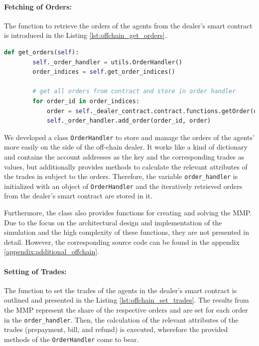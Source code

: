 \paragraph{Fetching of Orders:} The function to retrieve the orders of the agents from the dealer's 
smart contract is introduced in the Listing \ref{lst:offchain_get_orders}.

\begin{lstlisting}[float=htbp, label=lst:offchain_get_orders, caption=Fetching of Orders from Smart Contract Dealer, language=Python]
    def get_orders(self):
        self._order_handler = utils.OrderHandler()
        order_indices = self.get_order_indices()

        # get all orders from contract and store in order handler
        for order_id in order_indices:
            order = self._dealer_contract.contract.functions.getOrder(order_id).call()
            self._order_handler.add_order(order_id, order)
\end{lstlisting}

We developed a class \verb|OrderHandler| to store and manage the orders of the agents' more easily
on the side of the off-chain dealer. 
It works like a kind of dictionary and contains the account addresses as the key 
and the corresponding trades as values, but additionally provides methods to calculate
the relevant attributes of the trades in subject to the orders.
Therefore, the variable \verb|order_handler| is initialized with an object of \verb|OrderHandler|
and the iteratively retrieved orders from the dealer's smart contract are stored in it.

Furthermore, the class also provides functions for creating and solving the MMP.
Due to the focus on the architectural design and implementation of the simulation and the high complexity
of these functions, they are not presented in detail. However, the corresponding source code can be found in the appendix \ref{appendix:additional_offchain}.

\paragraph{Setting of Trades:} The function to set the trades of the agents in the dealer's smart contract 
is outlined and presented in the Listing \ref{lst:offchain_set_trades}.
The results from the MMP represent the share of the respective orders and are set for 
each order in the \verb|order_handler|. Then, the calculation of the relevant attributes of the trades
(prepayment, bill, and refund) is executed, wherefore the provided methods of the \verb|OrderHandler| come to bear.

